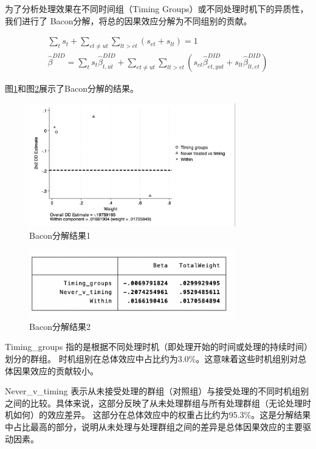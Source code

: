 \documentclass[a4paper,12pt]{article}
\begin{document}
为了分析处理效果在不同时间组（Timing Groups）或不同处理时机下的异质性，我们进行了
Bacon分解，将总的因果效应分解为不同组别的贡献。

$$
\begin{gathered}
\sum_t s_t+\sum_{e t \neq u t} \sum_{l t>e t}\left(s_{e t}+s_{l t}\right)=1 \\
\hat{\beta}^{D I D}=\sum_t s_t \hat{\beta}_{t, u t}^{D I D}+\sum_{e t \neq u t} \sum_{l t>e t}\left(s_{e t} \hat{\beta}_{e t, y u t}^{D I D}+s_{l t} \hat{\beta}_{l t, e t}^{D I D}\right)
\end{gathered}
$$

图\ref{fig:Bacon Decomposition1}和图\ref{fig:Bacon Decomposition2}展示了Bacon分解的结果。

\begin{figure}[H]
    \centering
    \includegraphics[width=0.8\textwidth]{Bacon1.png}
    \caption{Bacon分解结果1}
    \label{fig:Bacon Decomposition1}  
\end{figure}

\begin{figure}[H]
    \centering
    \includegraphics[width=0.8\textwidth]{Bacon2.png}
    \caption{Bacon分解结果2}
    \label{fig:Bacon Decomposition2}  
\end{figure}

Timing\_groups 指的是根据不同处理时机（即处理开始的时间或处理的持续时间）划分的群组。
时机组别在总体效应中占比约为3.0\%。这意味着这些时机组别对总体因果效应的贡献较小。

Never\_v\_timing 表示从未接受处理的群组（对照组）与接受处理的不同时机组别之间的比较。具体来说，这部分反映了从未处理群组与所有处理群组（无论处理时机如何）的效应差异。
这部分在总体效应中的权重占比约为95.3\%。这是分解结果中占比最高的部分，说明从未处理与处理群组之间的差异是总体因果效应的主要驱动因素。
\end{document}
